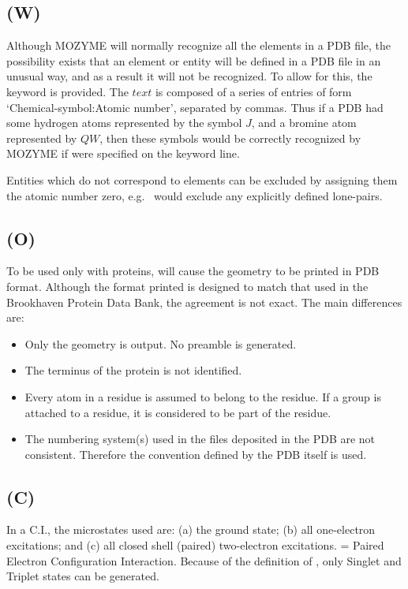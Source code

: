 \subsection*{ (W)}
\label{key_pdb}
Although MOZYME will normally recognize all the elements in a PDB file, the
possibility exists that an element or entity will be defined in a PDB file
in an unusual way, and as a result it will not be recognized.  To allow for this,
the keyword  is provided.  The $text$ is composed of a series
of entries of form `Chemical-symbol:Atomic number', separated by commas.
Thus if a PDB had some hydrogen atoms represented by the symbol $J$, and
a bromine atom represented by $QW$, then these symbols would be correctly
recognized by MOZYME if  were specified on the keyword line.

Entities which do not correspond to elements can be excluded by assigning them
the atomic number zero, e.g.\  would exclude any explicitly
defined lone-pairs.

\subsection*{ (O)}
To be used only with proteins,  will cause the geometry to
be printed in PDB format.  Although the format printed is designed to match
that used in the Brookhaven Protein Data Bank, the agreement is not exact.
The main differences are:
\begin{itemize}
\item Only the geometry is output. No preamble is generated.
\item The terminus of the protein is not identified.
\item Every atom in a residue is assumed to belong to the residue.  If a
group is attached to a residue, it is considered to be part of the residue.
\item The numbering system(s) used in the files deposited in the PDB are not
consistent. Therefore the convention defined by the PDB itself is used.
\end{itemize}

\subsection*{ (C)}
In a C.I., the microstates used are: (a) the ground state; (b) all one-electron
excitations; and (c) all closed shell (paired) two-electron excitations.
 = Paired Electron Configuration Interaction.  Because of the definition
of , only Singlet and Triplet states can be generated.

